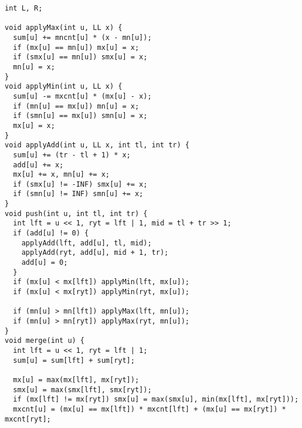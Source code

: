 \documentclass[FSZ,a4paper,onesided]{article}
\begin{document}
\begin{multicols*}{\COLS}
\begin{lstlisting}
int L, R;

void applyMax(int u, LL x) {
  sum[u] += mncnt[u] * (x - mn[u]);
  if (mx[u] == mn[u]) mx[u] = x;
  if (smx[u] == mn[u]) smx[u] = x;
  mn[u] = x;
}
void applyMin(int u, LL x) {
  sum[u] -= mxcnt[u] * (mx[u] - x);
  if (mn[u] == mx[u]) mn[u] = x;
  if (smn[u] == mx[u]) smn[u] = x;
  mx[u] = x;
}
void applyAdd(int u, LL x, int tl, int tr) {
  sum[u] += (tr - tl + 1) * x;
  add[u] += x;
  mx[u] += x, mn[u] += x;
  if (smx[u] != -INF) smx[u] += x;
  if (smn[u] != INF) smn[u] += x;
}
void push(int u, int tl, int tr) {
  int lft = u << 1, ryt = lft | 1, mid = tl + tr >> 1;
  if (add[u] != 0) {
    applyAdd(lft, add[u], tl, mid);
    applyAdd(ryt, add[u], mid + 1, tr);
    add[u] = 0;
  }
  if (mx[u] < mx[lft]) applyMin(lft, mx[u]);
  if (mx[u] < mx[ryt]) applyMin(ryt, mx[u]);

  if (mn[u] > mn[lft]) applyMax(lft, mn[u]);
  if (mn[u] > mn[ryt]) applyMax(ryt, mn[u]);
}
void merge(int u) {
  int lft = u << 1, ryt = lft | 1;
  sum[u] = sum[lft] + sum[ryt];

  mx[u] = max(mx[lft], mx[ryt]);
  smx[u] = max(smx[lft], smx[ryt]);
  if (mx[lft] != mx[ryt]) smx[u] = max(smx[u], min(mx[lft], mx[ryt]));
  mxcnt[u] = (mx[u] == mx[lft]) * mxcnt[lft] + (mx[u] == mx[ryt]) * mxcnt[ryt];


\end{lstlisting}
\end{multicols*}
\end{document}
